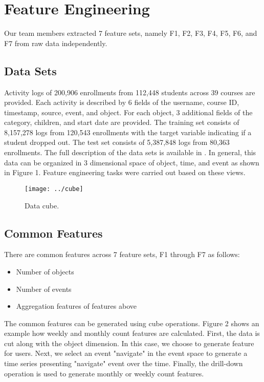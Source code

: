 \section{Feature Engineering}
Our team members extracted 7 feature sets, namely F1, F2, F3, F4, F5, F6, and F7 from raw data independently.

\subsection{Data Sets}
Activity logs of 200,906 enrollments from 112,448 students across 39 courses are provided.
Each activity is described by 6 fields of the username, course ID, timestamp, source, event, and object. 
For each object, 3 additional fields of the category, children, and start date are provided.
The training set consists of 8,157,278 logs from 120,543 enrollments with the target variable indicating if a student dropped out.  
The test set consists of 5,387,848 logs from 80,363 enrollments.
The full description of the data sets is available in \cite{kddcup2015_data}. In general, this data can be organized in 3 dimensional space of object, time, and event as shown in Figure 1. Feature engineering tasks were carried out based on these views.

\begin{figure}[!t]
	\centering
	\texttt{[image: ../cube]}
	\label{fig:cube}
	\caption{Data cube.}
\end{figure}


\subsection{Common Features}
There are common features across 7 feature sets, F1 through F7 as follows:
\begin{itemize}
	\item Number of objects
	\item Number of events
	\item Aggregation features of features above
\end{itemize}

The common features can be generated using cube operations. Figure 2 shows an example how weekly and monthly count features are calculated. First, the data is cut along with the object dimension. In this case, we choose to generate feature for users. Next, we select an event "navigate" in the event space to generate a time series presenting "navigate" event over the time. Finally, the drill-down operation is used to generate monthly or weekly count features.

